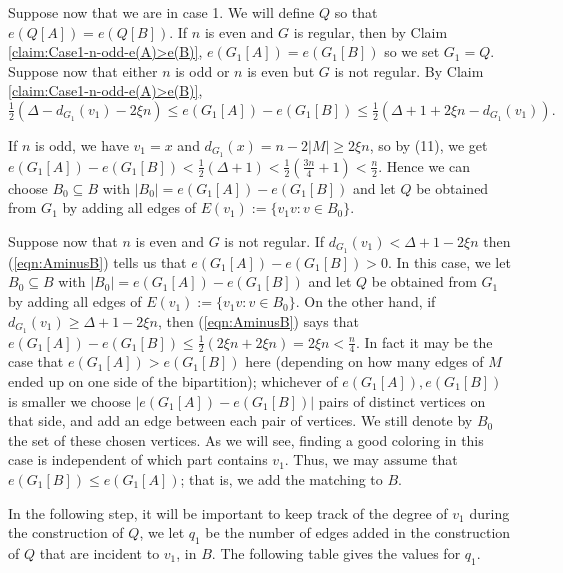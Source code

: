 \documentclass[11pt, oneside]{article}
\begin{document}
Suppose now that we are in case 1. We will define $Q$ so that $e(Q[A])=e(Q[B])$. If $n$ is even and $G$ is regular, then by Claim \ref{claim:Case1-n-odd-e(A)>e(B)}, $e(G_1[A])=e(G_1[B])$ so we set $G_1=Q$. Suppose now that either $n$ is odd or $n$ is even but $G$ is not regular. By Claim \ref{claim:Case1-n-odd-e(A)>e(B)},
\begin{equation}\label{eqn:AminusB} \tfrac{1}{2}(\Delta -d_{G_1}(v_1)-2\xi n)  \le e(G_1[A]) -e(G_1[B]) \le \tfrac{1}{2}(\Delta+1+2\xi n -d_{G_1}(v_1)). \end{equation}

If $n$ is odd, we have $v_1=x$ and $d_{G_1}(x)=n-2|M|\geq 2\xi n$, so by (11), we get  $e(G_1[A]) -e(G_1[B])<\tfrac{1}{2}(\Delta+1)<\tfrac{1}{2}(\tfrac{3n}{4}+1)<\tfrac{n}{2}$. Hence we can choose
$B_0\subseteq B$ with $|B_0| = e(G_1[A]) -e(G_1[B]) $ and let $Q$ be obtained from $G_1$ by adding all edges of  $E(v_1):=\{v_1v: v\in B_0\}$. 


Suppose now that $n$ is even and $G$ is not regular. If $d_{G_1}(v_1) <\Delta +1  -2\xi n$ then (\ref{eqn:AminusB}) tells us that $e(G_1[A]) -e(G_1[B])>0$. In this case, we let $B_0\subseteq B$ with $|B_0| = e(G_1[A]) -e(G_1[B]) $
and let $Q$ be obtained from $G_1$ by adding all edges of  $E(v_1):=\{v_1v: v\in B_0\}$. On the other hand, if $d_{G_1}(v_1)  \ge \Delta +1 -2\xi n$, then (\ref{eqn:AminusB}) says that $e(G_1[A]) -e(G_1[B]) \le \frac{1}{2}(2\xi n+2\xi n)=2\xi n<\tfrac{n}{4}$. In fact it may be the case that $e(G_1[A])>e(G_1[B])$ here (depending on how many edges of $M$ ended up on one side of the bipartition); whichever of $e(G_1[A]),e(G_1[B])$ is smaller we choose
$|e(G_1[A]) -e(G_1[B])|$ pairs of distinct vertices on that side, and add an edge between each pair of vertices.
We still denote by $B_0$ the set of these chosen vertices. 
As we will see, finding a good coloring in this case is independent of which part contains $v_1$. Thus, we may assume that $e(G_1[B]) \leq e(G_1[A])$; that is, we add the matching to $B$.


In the following step, it will be important to keep track of the degree of $v_1$ during the construction of $Q$, we let $q_1$ be the number of edges added in the construction of $Q$ that are incident to $v_1$, in $B$. The following table gives the values for $q_1$.\\
\end{document}
